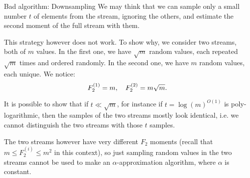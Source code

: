 \documentclass[a4paper]{article}
\begin{document}
\begin{parag}{Bad algorithm: Downsampling}
    We may think that we can sample only a small number $t$ of elements from the stream, ignoring the others, and estimate the second moment of the full stream with them.

    This strategy however does not work. To show why, we consider two streams, both of $m$ values. In the first one, we have $\sqrt{m}$ random values, each repeated $\sqrt{m}$ times and ordered randomly. In the second one, we have $m$ random values, each unique. We notice: 
    \[F_2^{\left(1\right)} = m, \mathspace F_2^{\left(2\right)} = m\sqrt{m}.\]

    It is possible to show that if $t \ll \sqrt{m}$, for instance if $t = \log\left(m\right)^{O\left(1\right)}$ is poly-logarithmic, then the samples of the two streams mostly look identical, i.e. we cannot distinguish the two streams with those $t$ samples. 

    The two streams however have very different $F_2$ moments (recall that $m \leq F_2^{\left(i\right)} \leq m^2$ in this context), so just sampling random values in the two streams cannot be used to make an $\alpha$-approximation algorithm, where $\alpha$ is constant.
\end{parag}
\end{document}

